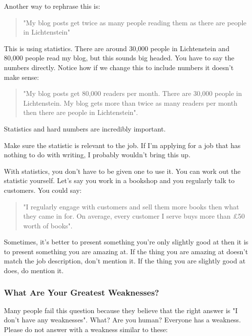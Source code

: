 \documentclass{article}
\begin{document}
Another way to rephrase this is:
\begin{quote}
    "My blog posts get twice as many people reading them as there are people
in Lichtenstein"
\end{quote}
This is using statistics. There are around 30,000 people in Lichtenstein
and 80,000 people read my blog, but this sounds big headed. You have to
say the numbers directly. Notice how if we change this to include
numbers it doesn't make sense:
\begin{quote}
    "My blog posts get 80,000 readers per month. There are 30,000 people in
Lichtenstein. My blog gets more than twice as many readers per month
then there are people in Lichtenstein".
\end{quote}
Statistics and hard numbers are incredibly important.

Make sure the statistic is relevant to the job. If I'm applying for a
job that has nothing to do with writing, I probably wouldn't bring this
up.

With statistics, you don't have to be given one to use it. You can work
out the statistic yourself. Let's say you work in a bookshop and you
regularly talk to customers. You could say:
\begin{quote}
    "I regularly engage with customers and sell them more books then what
they came in for. On average, every customer I serve buys more than £50
worth of books".
\end{quote}
Sometimes, it's better to present something you're only slightly good at
then it is to present something you are amazing at. If the thing you are
amazing at doesn't match the job description, don't mention it. If the
thing you are slightly good at does, do mention it.
\subsubsection{What Are Your Greatest Weaknesses?}
Many people fail this question because they believe that the right
answer is "I don't have any weaknesses". What? Are you human? Everyone
has a weakness. Please do not answer with a weakness similar to these:
\end{document}
